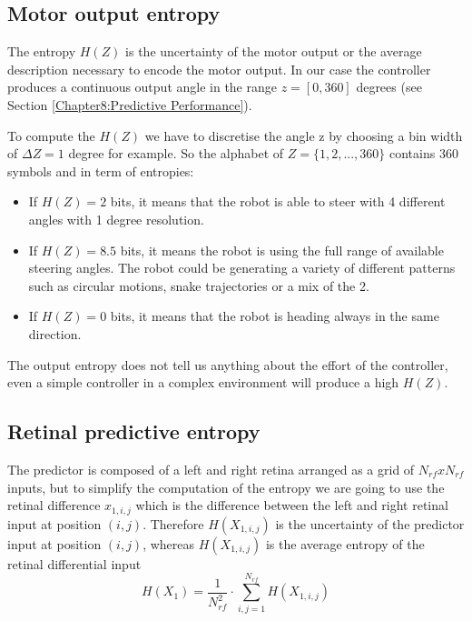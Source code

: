 \subsection{Motor output entropy}
The entropy $H(Z)$ is the uncertainty of the motor output or the average description
 necessary to encode the motor output.
In our case the controller produces a continuous output angle in the
 range $z=[0,360]$ degrees (see Section \ref{Chapter8:Predictive Performance}).

To compute the $H(Z)$ we have to discretise the angle z by choosing a bin width
 of $\Delta Z=1$ degree for example.
So the alphabet of $Z=\{1,2,...,360\}$ contains 360 symbols and in term of entropies:
\begin{itemize}
 \item If $H(Z)=2$ bits, it means that the robot is able to steer with 4 different angles with 1 degree resolution.
 \item If $H(Z)=8.5$ bits, it means the robot is using the full range of available steering angles.
The robot could be generating a variety of different patterns such as circular motions, snake trajectories or a mix of the 2.
 \item If $H(Z)=0$ bits, it means that the robot is heading always in the same direction.
\end{itemize}
The output entropy does not tell us anything about the effort of the controller, 
even a simple controller in a complex environment will produce a high $H(Z)$.
\subsection{Retinal predictive entropy}
The predictor is composed of a left and right retina arranged as a grid of
$N_{rf}xN_{rf}$ inputs, but to simplify the computation of the entropy
we are going to use the retinal difference $x_{1,i,j}$ which is the difference
between the left and right retinal input at position $(i,j)$.
Therefore  $H(X_{1,i,j})$ is the uncertainty of the predictor input at
position $(i,j)$, whereas $H(X_{1,i,j})$ is the average entropy of the
retinal differential input
\begin{equation}
H(X_{1})=\frac{1}{N_{rf}^2}\cdot \sum_{i,j=1}^{N_{rf}} H(X_{1,i,j})
\end{equation}

